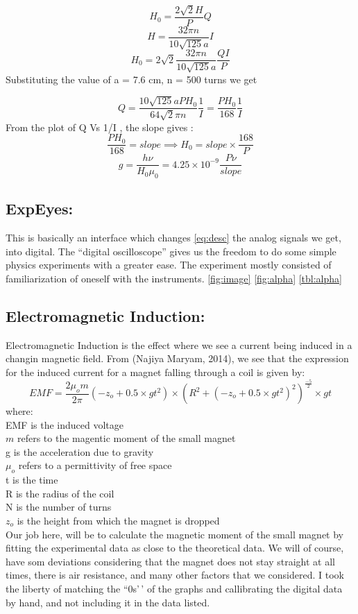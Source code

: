 \documentclass{../_layouts/ieeeconf}
\begin{document}
\[ H_0 = \frac{2\sqrt{2}H}{P}Q \]
\[ H=\frac{32\pi n}{10\sqrt{125}a}I \]
\[ H_0=2\sqrt{2}\frac{32\pi n}{10\sqrt{125}a}\frac{QI}{P} \]
Substituting the value of a = 7.6 cm, n = 500 turns we get

\begin{equation} Q=\frac{10\sqrt{125}a PH_0}{64\sqrt{2}\pi n }\frac{1}{I}=\frac{PH_0}{168}\frac{1}{I} \label{eq:desc}\end{equation}
From the plot of Q Vs 1/I , the slope gives :
\[ \frac{PH_0}{168}=slope \implies H_0=slope \times \frac{168}{P} \]
\[ g=\frac{h \nu}{H_0 \mu_0} = 4.25\times10^{-9} \frac{P \nu}{slope} \]

\subsection{ExpEyes:}

This is basically an interface which changes \ref{eq:desc} the analog signals we get, into digital. The ``digital oscilloscope'' gives us the freedom to do some simple physics experiments with a greater ease. The experiment mostly consisted of familiarization of oneself with the instruments. \ref{fig:image} \ref{fig:alpha} \ref{tbl:alpha}

\subsection{Electromagnetic Induction:}

Electromagnetic Induction is the effect where we see a current being induced in a changin magnetic field. From (Najiya Maryam, 2014), we see that the expression for the induced current for a magnet falling through a coil is given by:
\[ EMF = \frac{2\mu_o m}{2\pi}(-z_o+0.5\times gt^2) \times (R^2+(-z_o+0.5\times gt^2)^2)^\frac{-5}{2}\times gt \]
where:\\
EMF is the induced voltage\\
\(m\) refers to the magentic moment of the small magnet\\
g is the acceleration due to gravity\\
\(\mu_o\) refers to a permittivity of free space\\
t is the time\\
R is the radius of the coil\\
N is the number of turns\\
\(z_o\) is the height from which the magnet is dropped\\
Our job here, will be to calculate the magnetic moment of the small magnet by fitting the experimental data as close to the theoretical data. We will of course, have som deviations considering that the magnet does not stay straight at all times, there is air resistance, and many other factors that we considered. I took the liberty of matching the ``0s'\,' of the graphs and callibrating the digital data by hand, and not including it in the data listed.
\end{document}

